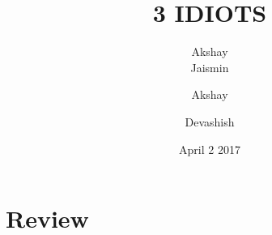 \documentclass{article}
\title{3 IDIOTS}
\author{Akshay\\Jaismin}
\author{Akshay}
\author{Devashish}
\date{April 2 2017}
\begin{document}
\maketitle
\section{Review}
\end{document}

